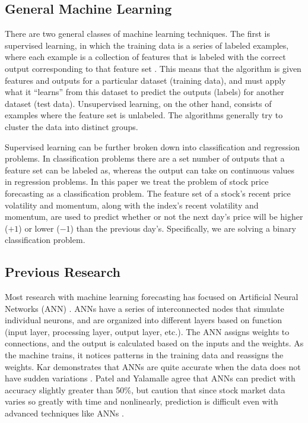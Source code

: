 \documentclass[pageno]{jpaper}
\begin{document}
\subsection{General Machine Learning}
There are two general classes of machine learning techniques. The first is supervised learning, in which the training data is a series of labeled examples, where each example is a collection of features that is labeled with the correct output corresponding to that feature set \cite{brownlee}. This means that the algorithm is given features and outputs for a particular dataset (training data), and must apply what it ``learns'' from this dataset to predict the outputs (labels) for another dataset (test data). Unsupervised learning, on the other hand, consists of examples where the feature set is unlabeled. The algorithms generally try to cluster the data into distinct groups.

Supervised learning can be further broken down into classification and regression problems. In classification problems there are a set number of outputs that a feature set can be labeled as, whereas the output can take on continuous values in regression problems. In this paper we treat the problem of stock price forecasting as a classification problem. The feature set of a stock's recent price volatility and momentum, along with the index's recent volatility and momentum, are used to predict whether or not the next day's price will be higher ($+1$) or lower ($-1$) than the previous day's. Specifically, we are solving a binary classification problem.

\subsection{Previous Research}
\label{subsec: previous}

Most research with machine learning forecasting has focused on Artificial Neural Networks (ANN) \cite{krollner}. ANNs have a series of interconnected nodes that simulate individual neurons, and are organized into different layers based on function (input layer, processing layer, output layer, etc.). The ANN assigns weights to connections, and the output is calculated based on the inputs and the weights. As the machine trains, it notices patterns in the training data and reassigns the weights. Kar demonstrates that ANNs are quite accurate when the data does not have sudden variations \cite{kar}. Patel and Yalamalle agree that ANNs can predict with accuracy slightly greater than 50\%, but caution that since stock market data varies so greatly with time and nonlinearly, prediction is difficult even with advanced techniques like ANNs \cite{patel}.
\end{document}
